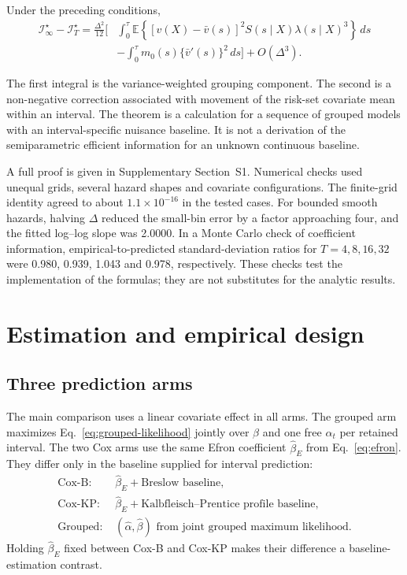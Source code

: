 \documentclass[smallextended,natbib]{svjour3}
\begin{document}
\begin{theorem}
\label{thm:profile-small-bin}
Under the preceding conditions,
\begin{align}
\mathcal I_\infty^\star-\mathcal I_T^\star
=
\frac{\Delta^2}{12}
\Bigg[&
\int_0^\tau
\mathbb E\left\{[v(X)-\bar v(s)]^2S(s\mid X)\lambda(s\mid X)^3\right\}\,ds
\nonumber\\
&-
\int_0^\tau m_0(s)\{\bar v'(s)\}^2\,ds
\Bigg]+O(\Delta^3).
\label{eq:profile-small-bin}
\end{align}
\end{theorem}

The first integral is the variance-weighted grouping component. The second is a non-negative correction associated with movement of the risk-set covariate mean within an interval. The theorem is a calculation for a sequence of grouped models with an interval-specific nuisance baseline. It is not a derivation of the semiparametric efficient information for an unknown continuous baseline.

A full proof is given in Supplementary Section~S1. Numerical checks used unequal grids, several hazard shapes and covariate configurations. The finite-grid identity agreed to about $1.1\times10^{-16}$ in the tested cases. For bounded smooth hazards, halving $\Delta$ reduced the small-bin error by a factor approaching four, and the fitted log--log slope was 2.0000. In a Monte Carlo check of coefficient information, empirical-to-predicted standard-deviation ratios for $T=4,8,16,32$ were 0.980, 0.939, 1.043 and 0.978, respectively. These checks test the implementation of the formulas; they are not substitutes for the analytic results.

\section{Estimation and empirical design}
\label{sec:methods}

\subsection{Three prediction arms}
\label{sec:arms}

The main comparison uses a linear covariate effect in all arms. The grouped arm maximizes Eq.~\eqref{eq:grouped-likelihood} jointly over $\beta$ and one free $\alpha_t$ per retained interval. The two Cox arms use the same Efron coefficient $\widehat\beta_E$ from Eq.~\eqref{eq:efron}. They differ only in the baseline supplied for interval prediction:
\begin{equation}
\begin{split}
\text{Cox-B: }&\widehat\beta_E+\text{Breslow baseline},\\
\text{Cox-KP: }&\widehat\beta_E+\text{Kalbfleisch--Prentice profile baseline},\\
\text{Grouped: }&(\widehat\alpha,\widehat\beta)\text{ from joint grouped maximum likelihood}.
\end{split}
\label{eq:three-arms}
\end{equation}
Holding $\widehat\beta_E$ fixed between Cox-B and Cox-KP makes their difference a baseline-estimation contrast.
\end{document}
